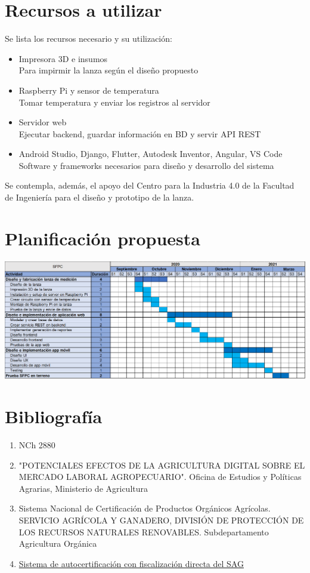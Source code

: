 \documentclass[12pt, letterpaper]{article}
\begin{document}
\section{Recursos a utilizar}
Se lista los recursos necesario y su utilización:
\begin{itemize}
	\item Impresora 3D e insumos\\
	Para impirmir la lanza según el diseño propuesto
	\item Raspberry Pi y sensor de temperatura\\
	Tomar temperatura y enviar los registros al servidor
	\item Servidor web\\
	Ejecutar backend, guardar información en BD y servir API REST
	\item Android Studio, Django, Flutter, Autodesk Inventor, Angular,  VS Code\\
	Software y frameworks necesarios para diseño y desarrollo del sistema
	
\end{itemize}
Se contempla, además, el apoyo del Centro para la Industria 4.0 de la Facultad de Ingeniería para el diseño y prototipo de la lanza.
\section{Planificación propuesta }
\includegraphics[scale=0.45]{figures/gantt.png}


\section{Bibliografía}
\begin{enumerate}
	\item NCh 2880
	\item "POTENCIALES EFECTOS DE LA AGRICULTURA DIGITAL SOBRE EL MERCADO LABORAL AGROPECUARIO". Oficina de Estudios y Políticas Agrarias, Ministerio de Agricultura
	\item Sistema Nacional de Certificación de Productos Orgánicos Agrícolas. SERVICIO AGRÍCOLA Y GANADERO, DIVISIÓN DE PROTECCIÓN DE LOS RECURSOS NATURALES RENOVABLES. Subdepartamento Agricultura Orgánica
	\item \href{http://www.sag.cl/ambitos-de-accion/sistema-de-auto-certificacion-con-fiscalizacion-directa-del-sag}{Sistema de autocertificación con fiscalización directa del SAG}
\end{enumerate}
\end{document}
